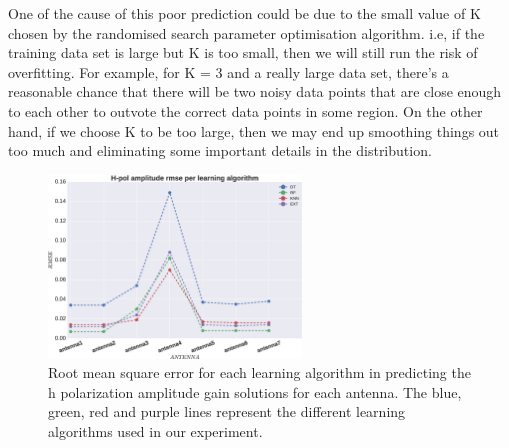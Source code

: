 One of the cause of this poor prediction could be due to the small value of K chosen by the randomised search parameter optimisation algorithm. i.e, if the training data set is large but K is too small, then we will still run the risk of overfitting. For example, for K = 3 and a really large data set, there’s a reasonable chance that there will be two noisy data points that are close enough to each other to outvote the correct data points in some region. On the other hand, if we choose K to be too large, then we may end up smoothing things out too much and eliminating some important details in the distribution. 
\begin{figure}[H]
  \centering
    \includegraphics[width=0.6\textwidth]{images/Hpol-amp.eps}
    \caption{Root mean square error for each learning algorithm in predicting the h polarization amplitude gain solutions for each antenna. The blue, green, red and purple lines represent the different learning algorithms used in our experiment.}
  \label{amprm}
 \end{figure} 

